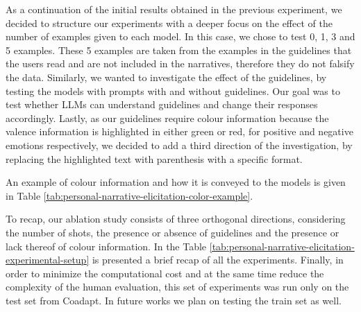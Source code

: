 As a continuation of the initial results obtained in the previous experiment, we decided to structure our experiments with a deeper focus on the effect of the number of examples given to each model. In this case, we chose to test 0, 1, 3 and 5 examples. These 5 examples are taken from the examples in the guidelines that the users read and are not included in the narratives, therefore they do not falsify the data. Similarly, we wanted to investigate the effect of the guidelines, by testing the models with prompts with and without guidelines. Our goal was to test whether LLMs can understand guidelines and change their responses accordingly. Lastly, as our guidelines require colour information because the valence information is highlighted in either green or red, for positive and negative emotions respectively, we decided to add a third direction of the investigation, by replacing the highlighted text with parenthesis with a specific format.

An example of colour information and how it is conveyed to the models is given in Table \ref{tab:personal-narrative-elicitation-color-example}. 

To recap, our ablation study consists of three orthogonal directions, considering the number of shots, the presence or absence of guidelines and the presence or lack thereof of colour information. In the Table \ref{tab:personal-narrative-elicitation-experimental-setup} is presented a brief recap of all the experiments. 
Finally, in order to minimize the computational cost and at the same time reduce the complexity of the human evaluation, this set of experiments was run only on the test set from Coadapt. In future works we plan on testing the train set as well.

